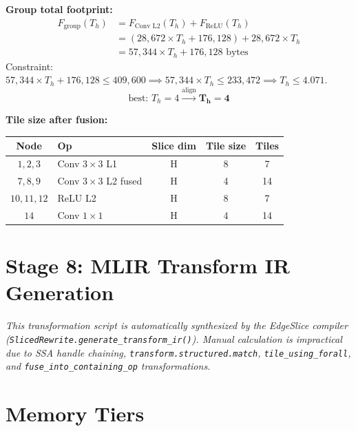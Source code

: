 \documentclass[11pt,a4paper]{article}
\begin{document}
\textbf{Group total footprint:}
\begin{align*}
F_{\text{group}}(T_h) &= F_{\text{Conv L2}}(T_h) + F_{\text{ReLU}}(T_h) \\
&= (28,672 \times T_h + 176,128) + 28,672 \times T_h \\
&= 57,344 \times T_h + 176,128\text{ bytes}
\end{align*}
Constraint: $57,344 \times T_h + 176,128 \le 409,600 \implies 57,344 \times T_h \le 233,472 \implies T_h \le 4.071$.
$$\text{best: } T_h = 4 \xrightarrow{\text{align}} \mathbf{T_h = 4}$$

\textbf{Tile size after fusion:}
\begin{table}[H]
\centering
\begin{tabular}{clccc}
\toprule
\textbf{Node} & \textbf{Op} & \textbf{Slice dim} & \textbf{Tile size} & \textbf{Tiles} \\
\midrule
$1, 2, 3$   & Conv $3\times 3$ L1       & H & 8 & 7 \\
$7, 8, 9$   & Conv $3\times 3$ L2 fused & H & 4 & 14 \\
$10, 11, 12$ & ReLU L2                   & H & 8 & 7 \\
$14$         & Conv $1\times 1$          & H & 4 & 14 \\
\bottomrule
\end{tabular}
\end{table}

\newpage

\section{Stage 8: MLIR Transform IR Generation}

\textit{This transformation script is automatically synthesized by the EdgeSlice compiler (\texttt{SlicedRewrite.generate\_transform\_ir()}). Manual calculation is impractical due to SSA handle chaining, \texttt{transform.structured.match}, \texttt{tile\_using\_forall}, and \texttt{fuse\_into\_containing\_op} transformations.}

\section{Memory Tiers}
\end{document}
